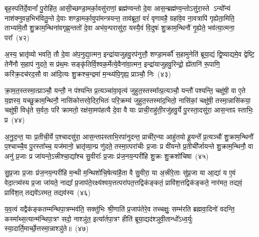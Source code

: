 {\anuvakamend[{म॒नु॒ष्य॒च॒रावु॑दपा॒त्रमु॑प॒ह्वये॑त द्विदेव॒त्याः᳚ षट्च॑त्वारिꣳशच्च}]}%

बृह॒स्पति॑र्दे॒वानां᳚ पु॒रोहि॑त॒ आसी॒च्छण्डा॒मर्का॒वसु॑राणां॒ ब्रह्म॑ण्वन्तो दे॒वा आस॒न्ब्रह्म॑ण्व॒न्तो\-ऽसु॑रा॒स्ते \-ऽन्यो᳚न्यं नाश॑क्नुवन्न॒भिभ॑वितु॒न्ते दे॒वाः शण्डा॒मर्का॒वुपा॑मन्त्रयन्त॒ ताव॑ब्रूतां॒ वरं॑ वृणावहै॒ ग्रहा॑वे॒व ना॒वत्रापि॑ गृह्येता॒मिति॒ ताभ्या॑मे॒तौ शु॒क्राम॒न्थिना॑वगृह्ण॒न्ततो॑ दे॒वा अभ॑व॒न्परासु॑रा॒ यस्यै॒वं वि॒दुषः॑ शु॒क्राम॒न्थिनौ॑ गृ॒ह्येते॒ भव॑त्या॒त्मना॒ परा᳚~(४२)

अ॒स्य॒ भ्रातृ॑व्यो भवति॒ तौ दे॒वा अ॑प॒नुद्या॒त्मन॒ इन्द्रा॑याजुहवु॒रप॑नुत्तौ॒ शण्डा॒मर्कौ॑ स॒हामुनेति॑ ब्रूया॒द्यं द्वि॒ष्याद्यमे॒व द्वेष्टि॒ तेनै॑नौ स॒हाप॑ नुदते॒ स प्र॑थ॒मः सङ्कृ॑तिर्वि॒श्वक॒र्मेत्ये॒वैना॑वा॒त्मन॒ इन्द्रा॑याजुहवु॒रिन्द्रो॒ ह्ये॑तानि॑ रू॒पाणि॒ करि॑क्र॒दच॑रद॒सौ वा आ॑दि॒त्यः शु॒क्रश्च॒न्द्रमा॑ म॒न्थ्य॑पि॒गृह्य॒ प्राञ्चौ॒ निः~(४३)

क्रा॒म॒त॒स्तस्मा॒त्प्राञ्चौ॒ यन्तौ॒ न प॑श्यन्ति प्र॒त्यञ्चा॑वा॒वृत्य॑ जुहुत॒स्तस्मा᳚त्प्र॒त्यञ्चौ॒ यन्तौ॑ पश्यन्ति॒ चक्षु॑षी॒ वा ए॒ते य॒ज्ञस्य॒ यच्छु॒क्राम॒न्थिनौ॒ नासि॑कोत्तरवे॒दिर॒भितः॑ परि॒क्रम्य॑ जुहुत॒स्तस्मा॑द॒भितो॒ नासि॑कां॒ चक्षु॑षी॒ तस्मा॒न्नासि॑कया॒ चक्षु॑षी॒ विधृ॑ते स॒र्वतः॒ परि॑ क्रामतो॒ रक्ष॑सा॒मप॑हत्यै दे॒वा वै याः प्राची॒राहु॑ती॒रजु॑हवु॒र्ये पु॒रस्ता॒दसु॑रा॒ आस॒न्ताꣴ स्ताभिः॒ प्र~(४४)

अ॒नु॒द॒न्त॒ याः प्र॒तीची॒र्ये प॒श्चादसु॑रा॒ आस॒न्ताꣴस्ताभि॒रपा॑नुदन्त॒ प्राची॑र॒न्या आहु॑तयो हू॒यन्ते᳚ प्र॒त्यञ्चौ॑ शु॒क्राम॒न्थिनौ॑ प॒श्चाच्चै॒व पु॒रस्ता᳚च्च॒ यज॑मानो॒ भ्रातृ॑व्या॒न्प्र णु॑दते॒ तस्मा॒त्परा॑चीः प्र॒जाः प्र वी॑यन्ते प्र॒तीची᳚र्जायन्ते शु॒क्राम॒न्थिनौ॒ वा अनु॑ प्र॒जाः प्र जा॑यन्ते॒\-ऽत्त्रीश्चा॒द्या᳚श्च सु॒वीराः᳚ प्र॒जाः प्र॑ज॒नय॒न्परी॑हि शु॒क्रः शु॒क्रशो॑चिषा~(४५)

सु॒प्र॒जाः प्र॒जाः प्र॑ज॒नय॒न्परी॑हि म॒न्थी म॒न्थिशो॑चि॒षेत्या॑है॒ता वै सु॒वीरा॒ या अ॒त्त्रीरे॒ताः सु॑प्र॒जा या आ॒द्या॑ य ए॒वं वेदा॒त्त्र्य॑स्य प्र॒जा जा॑यते॒ नाद्या᳚ प्र॒जाप॑ते॒रक्ष्य॑श्वय॒त्तत्परा॑पत॒त्तद्विक॑ङ्कतं॒ प्रावि॑श॒त्तद्विक॑ङ्कते॒ नार॑मत॒ तद्यवं॒ प्रावि॑श॒त् तद्यवे॑\-ऽरमत॒ तद्यव॑स्य~(४६)

य॒व॒त्वं यद्वैक॑ङ्कतम्मन्थिपा॒त्रम्भव॑ति॒ सक्तु॑भिः श्री॒णाति॑ प्र॒जाप॑तेरे॒व तच्चक्षुः॒ सम्भ॑रति ब्रह्मवा॒दिनो॑ वदन्ति॒ कस्मा᳚थ्स॒त्यान्म॑न्थिपा॒त्रꣳ सदो॒ नाश्ञु॑त॒ इत्या᳚र्तपा॒त्रꣳ हीति॑ ब्रूया॒द्यद॑श्ञुवी॒तान्धो᳚\-ऽध्व॒र्युः स्या॒दार्ति॒मार्च्छे॒त्तस्मा॒न्नाश्ञु॑ते॥~(४७)

{\anuvakamend[{आ॒त्मना॒ परा॒ निष्प्र शु॒क्रशो॑चिषा॒ यव॑स्य स॒प्तत्रिꣳ॑शच्च}]}%

